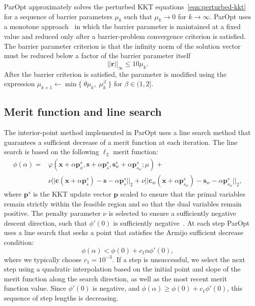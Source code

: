 \documentclass[12pt]{article}
\newcommand{\mb}{\mathbf}
\begin{document}
ParOpt approximately solves the perturbed KKT equations~\eqref{eqn:perturbed-kkt} for a sequence of barrier parameters $\mu_{k}$ such that $\mu_{k} \rightarrow 0$ for $k \rightarrow \infty$. 
ParOpt uses a monotone approach~\citet{Fiacco:McCormick:1990} in which the barrier parameter is maintained at a fixed value and reduced only after a barrier-problem convergence criterion is satisfied.
The barrier parameter criterion is that the infinity norm of the solution vector must be reduced below a factor of the barrier parameter itself
%
\begin{equation}
  \label{eqn:barrier-stopping-criterion}
  ||\mb{r}||_{\infty}  \le 10 \mu_{k}.
\end{equation}
After the barrier criterion is satisfied, the parameter is modified using the expression $\mu_{k+1} \leftarrow \min \{ \; \theta \mu_{k},\; \mu_{k}^{\beta}\;\}$ for $\beta \in (1, 2]$.

\subsection{Merit function and line search}

The interior-point method implemented in ParOpt uses a line search method that guarantees a sufficient decrease of a merit function at each iteration.
The line search is based on the following $\ell_{2}$ merit function:
%
\begin{equation}
  \label{eqn:merit-function}
  \begin{aligned}
    \phi(\alpha) = & \varphi(\mb{x} + \alpha\mb{p}_{x}^{s}, \mb{s} + \alpha\mb{p}_{s}^{s}, \mb{s}_{w}^{s} + \alpha\mb{p}^{s}_{s_{w}}; \mu) + \\
    & \nu ||\mb{c}(\mb{x} + \alpha\mb{p}_{s}^{s}) - \mb{s} - \alpha \mb{p}_{s}^{s}||_{2} +
    \nu ||\mb{c}_{w}(\mb{x} + \alpha\mb{p}^{s}_{s_{w}}) - \mb{s}_{w} - \alpha\mb{p}_{s_{w}}^{s}||_{2},
  \end{aligned}
\end{equation}
%
where $\mb{p}^{s}$ is the KKT update vector $\mb{p}$ scaled to ensure that the primal variables remain strictly within the feasible region and so that the dual variables remain positive.
The penalty parameter $\nu$ is selected to ensure a sufficiently negative descent direction, such that $\phi'(0)$ is sufficiently negative~\citep{Nocedal.Wright}. 
At each step ParOpt uses a line search that seeks a point that satisfies the Armijo sufficient decrease condition:
%
\begin{equation*}
  \phi(\alpha) < \phi(0) + c_{1} \alpha \phi'(0),
\end{equation*}
where we typically choose $c_{1} = 10^{-3}$. If a step is unsuccessful, we select the next step using a quadratic interpolation based on the initial point and slope of the merit function along the search direction, as well as the most recent merit function value. 
Since $\phi'(0)$ is negative, and $\phi(\alpha) \ge \phi(0) + c_{1} \phi'(0)$, this sequence of step lengths is decreasing.
\end{document}
